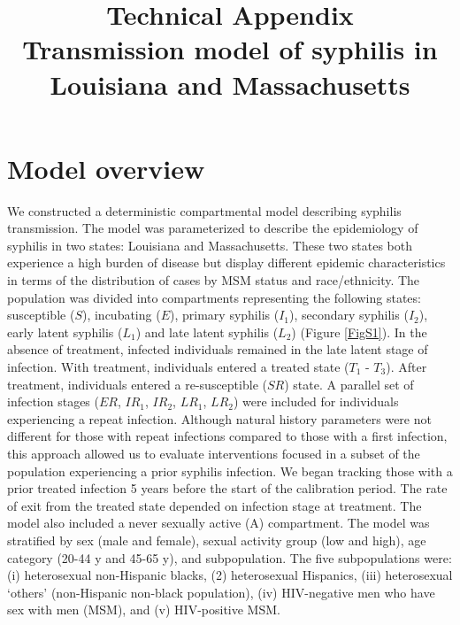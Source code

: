 \documentclass[a4paper]{article}
\title{\textbf{Technical Appendix}\\
Transmission model of syphilis in Louisiana and Massachusetts\\}
\author{}
\date{}
\begin{document}
\maketitle



\section{Model overview}
\label{sec:introduction}
We constructed a deterministic compartmental model describing syphilis transmission. The model was parameterized to describe the epidemiology of syphilis in two states: Louisiana and Massachusetts. These two states both experience a high burden of disease but display different epidemic characteristics in terms of the distribution of cases by MSM status and race/ethnicity. The population was divided into compartments representing the following states: susceptible ($S$), incubating ($E$), primary syphilis ($I_1$), secondary syphilis ($I_2$), early latent syphilis ($L_1$) and late latent syphilis ($L_2$) (Figure \ref{FigS1}). In the absence of treatment, infected individuals remained in the late latent stage of infection. With treatment, individuals entered a treated state ($T_1$ - $T_3$). After treatment, individuals entered a re-susceptible ($SR$) state. A parallel set of infection stages ($ER$, $IR_1$, $IR_2$, $LR_1$, $LR_2$) were included for individuals experiencing a repeat infection. Although natural history parameters were not different for those with repeat infections compared to those with a first infection, this approach allowed us to evaluate interventions focused in a subset of the population experiencing a prior syphilis infection. We began tracking those with a prior treated infection 5 years before the start of the calibration period. The rate of exit from the treated state depended on infection stage at treatment.  The model also included a never sexually active (A) compartment. The model was stratified by sex (male and female), sexual activity group (low and high), age category (20-44 y and 45-65 y), and subpopulation. The five subpopulations were: (i) heterosexual non-Hispanic blacks, (2) heterosexual Hispanics, (iii) heterosexual ‘others’ (non-Hispanic non-black population), (iv) HIV-negative men who have sex with men (MSM), and (v) HIV-positive MSM. 
\end{document}
